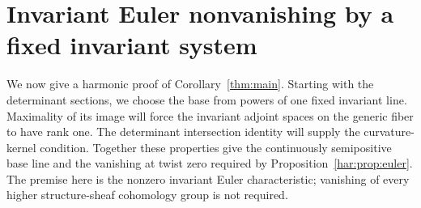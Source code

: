 \section{Invariant Euler nonvanishing by a fixed invariant system}\label{har:sec:eulerroute}

We now give a harmonic proof of Corollary~\ref{thm:main}. Starting with
the determinant sections, we choose the base from powers of one fixed
invariant line. Maximality of its image will force the invariant
adjoint spaces on the generic fiber to have rank one. The determinant
intersection identity will supply the curvature-kernel condition.
Together these properties give the continuously semipositive base line
and the vanishing at twist zero required by
Proposition~\ref{har:prop:euler}. The premise here is the nonzero
invariant Euler characteristic; vanishing of every higher
structure-sheaf cohomology group is not required.

